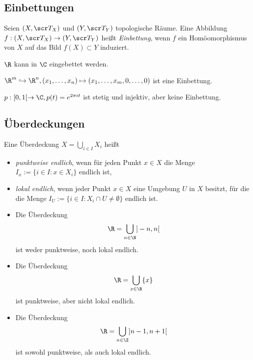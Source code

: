 \subsection{Einbettungen}

\begin{df}
	Seien $(X,\scr T_X)$ und $(Y, \scr T_Y)$ topologische Räume.
	Eine Abbildung $f: (X, \scr T_X) \to (Y, \scr T_Y)$ heißt \emph{Einbettung}, wenn $f$ ein Homöomorphismus von $X$ auf das Bild $f(X) \subset Y$ induziert.
\end{df}

\begin{ex}
	$\R$ kann in $\C$ eingebettet werden.
\end{ex}


\begin{ex}
	$\R^m \injto \R^n, (x_1, \dotsc, x_n) \mapsto (x_1, \dotsc, x_m, 0, \dotsc, 0)$ ist eine Einbettung.

	$p: [0,1[ \to \C, p(t) = e^{2\pi i t}$ ist stetig und injektiv, aber keine Einbettung.
\end{ex}

\subsection{Überdeckungen}

\begin{df}
	Eine Überdeckung $X = \bigcup_{i\in I} X_i$ heißt
	\begin{itemize}
		\item
			\emph{punktweise endlich}, wenn für jeden Punkt $x \in X$ die Menge $I_x := \{ i \in I : x \in X_i \}$ endlich ist,
		\item
			\emph{lokal endlich}, wenn jeder Punkt $x \in X$ eine Umgebung $U$ in $X$ besitzt, für die die Menge $I_U := \{ i \in I : X_i \cap U \neq \emptyset \}$ endlich ist.
	\end{itemize}
\end{df}

\begin{ex}
	\begin{itemize}
		\item
			Die Überdeckung
			\[
				\R = \bigcup_{n \in \N} ]-n, n[
			\]
			ist weder punktweise, noch lokal endlich.
		\item
			Die Überdeckung
			\[
				\R = \bigcup_{x \in \R} \{x\}
			\]
			ist punktweise, aber nicht lokal endlich.
		\item
			Die Überdeckung
			\[
				\R = \bigcup_{n\in \Z} ]n-1, n+ 1[
			\]
			ist sowohl punktweise, als auch lokal endlich.
	\end{itemize}
\end{ex}

